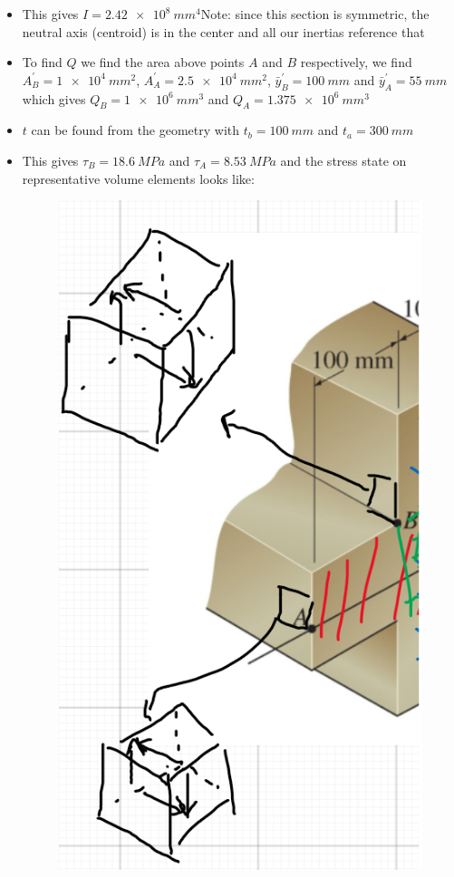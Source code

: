 \documentclass[12pt, oneside]{article}
\begin{document}
\begin{enumerate}
\begin{itemize}
\begin{figure}[H]
					\end{figure}
				\item This gives $I= 	\SI{2.42e8}{mm^4} $Note: since this section is symmetric, the neutral axis (centroid) is in the center and all our inertias reference that
				\item To find $Q$ we find the area above points $A$ and $B$ respectively, we find $A^\prime_B = 	\SI{1e4}{mm^2} $, $A^\prime_A = 	\SI{2.5e4}{mm^2} $, $\bar{y}^\prime_B = 	\SI{100}{mm} $ and $\bar{y}^\prime_A = 	\SI{55}{mm} $ which gives $Q_B = 	\SI{1e6}{mm^3} $ and $Q_A = 	\SI{1.375e6}{mm^3} $
				\item $t$ can be found from the geometry with $t_b = 	\SI{100 }{mm} $ and $t_a = 	\SI{300}{mm} $
				\item This gives $\tau_B = 	\SI{18.6 }{MPa} $ and $\tau_A = 	\SI{8.53}{MPa} $ and the stress state on representative volume elements looks like:
					\begin{figure}[H]
						\centering
						\includegraphics[width=0.2\linewidth]{6-1b}
					\end{figure}
			\end{itemize}


\end{enumerate}
\end{document}
